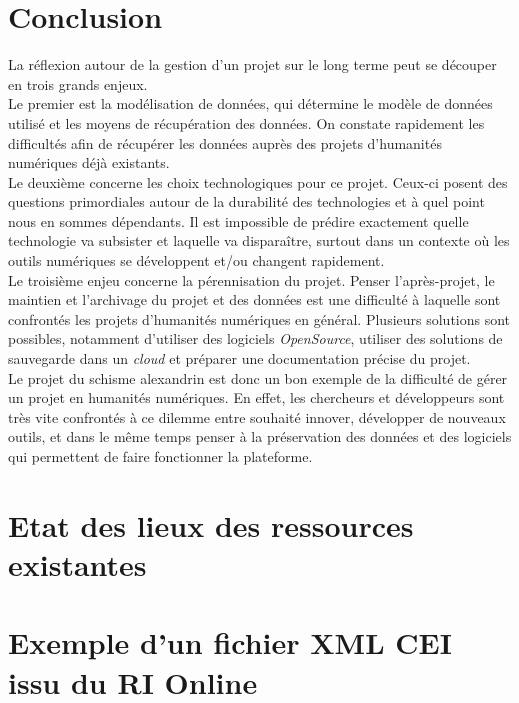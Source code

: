\documentclass[a4paper,12pt,twoside]{book}
\begin{document}
    \chapter*{Conclusion}
	La réflexion autour de la gestion d’un projet sur le long terme peut se découper en trois grands enjeux.\\
Le premier est la modélisation de données, qui détermine le modèle de données utilisé et les moyens de récupération des données. On constate rapidement les difficultés afin de récupérer les données auprès des projets d’humanités numériques déjà existants.\\
Le deuxième concerne les choix technologiques pour ce projet. Ceux-ci posent des questions primordiales autour de la durabilité des technologies et à quel point nous en sommes dépendants. Il est impossible de prédire exactement quelle technologie va subsister et laquelle va disparaître, surtout dans un contexte où les outils numériques se développent et/ou changent rapidement.\\ 
Le troisième enjeu concerne la pérennisation du projet. Penser l’après-projet, le maintien et l’archivage du projet et des données est une difficulté à laquelle sont confrontés les projets d’humanités numériques en général. Plusieurs solutions sont possibles, notamment d’utiliser des logiciels \textit{OpenSource}, utiliser des solutions de sauvegarde dans un \textit{cloud} et préparer une documentation précise du projet.\\

Le projet du schisme alexandrin est donc un bon exemple de la difficulté de gérer un projet en humanités numériques. En effet, les chercheurs et développeurs sont très vite confrontés à ce dilemme entre souhaité innover, développer de nouveaux outils, et dans le même temps penser à la préservation des données et des logiciels qui permettent de faire fonctionner la plateforme.
	
	\appendix

        \chapter[Etat de l'existant]{Etat des lieux des ressources existantes}
            \begin{landscape}
                 
            \end{landscape}

        \chapter[Schéma XML CEI]{Exemple d'un fichier XML CEI issu du RI Online}
            
        
\end{document}
